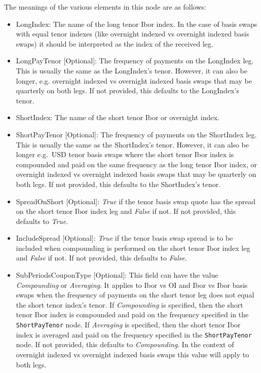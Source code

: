 The meanings of the various elements in this node are as follows:
\begin{itemize}
\item LongIndex: The name of the long tenor Ibor index. In the case of basis swaps with equal tenor indexes (like overnight 
indexed vs overnight indexed basis swaps) it should be interpreted as the index of the received leg.
\item LongPayTenor [Optional]: The frequency of payments on the LongIndex leg. This is usually the same as the LongIndex's 
tenor. However, it can also be longer, e.g. overnight indexed vs overnight indexed basis swaps that may be quarterly on 
both legs. If not provided, this defaults to the LongIndex's tenor.
\item ShortIndex: The name of the short tenor Ibor or overnight index.
\item ShortPayTenor [Optional]: The frequency of payments on the ShortIndex leg. This is usually the same as the
ShortIndex's tenor. However, it can also be longer e.g.\ USD tenor basis swaps where the short tenor Ibor
index is compounded and paid on the same frequency as the long tenor Ibor index, or overnight indexed vs overnight 
indexed basis swaps that may be quarterly on both legs. If not provided, this defaults to the ShortIndex's tenor.
\item SpreadOnShort [Optional]: \emph{True} if the tenor basis swap quote has the spread on the short tenor Ibor index
leg and \emph{False} if not. If not provided, this defaults to \emph{True}.
\item IncludeSpread [Optional]: \emph{True} if the tenor basis swap spread is to be included when compounding is
performed on the short tenor Ibor index leg and \emph{False} if not. If not provided, this defaults to \emph{False}.
\item SubPeriodsCouponType [Optional]: This field can have the value \emph{Compounding} or \emph{Averaging}. It applies 
to Ibor vs OI and Ibor vs Ibor basis swaps when the frequency of payments on the short tenor leg does not equal the 
short tenor index's tenor. If \emph{Compounding} is specified, then the short tenor Ibor index is compounded and paid on
the frequency specified in the \lstinline!ShortPayTenor! node. If \emph{Averaging} is specified, then the short tenor 
Ibor index is averaged and paid on the frequency specified in the \lstinline!ShortPayTenor! node. If not provided, this 
defaults to \emph{Compounding}. In the context of overnight indexed vs overnight indexed basis swaps this value will apply 
to both legs.
\end{itemize}

